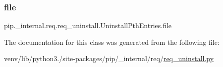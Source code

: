 \subsubsection{\texorpdfstring{file}{file}}
{\footnotesize\ttfamily pip.\+\_\+internal.\+req.\+req\+\_\+uninstall.\+Uninstall\+Pth\+Entries.\+file}



The documentation for this class was generated from the following file\+:\begin{DoxyCompactItemize}
\item 
venv/lib/python3./site-\/packages/pip/\+\_\+internal/req/\hyperlink{req__uninstall_8py}{req\+\_\+uninstall.\+py}\end{DoxyCompactItemize}
